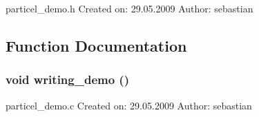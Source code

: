 particel\_\-demo.h Created on: 29.05.2009 Author: sebastian 

\subsection{Function Documentation}
\subsubsection[{writing\_\-demo}]{\setlength{\rightskip}{0pt plus 5cm}void writing\_\-demo ()}\label{writing__demo_8h_abdd925f1d9c8a09b9950c059c51e02d1}


particel\_\-demo.c Created on: 29.05.2009 Author: sebastian 
